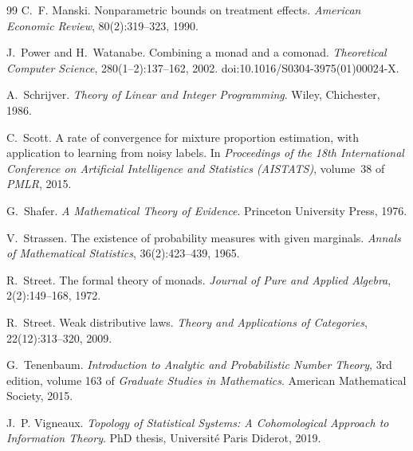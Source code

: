 \documentclass[11pt]{article}
\theoremstyle{definition}
\theoremstyle{remark}
\begin{document}
\begin{thebibliography}{99}
C.~F. Manski.
\newblock Nonparametric bounds on treatment effects.
\newblock \emph{American Economic Review}, 80(2):319--323, 1990.

J.~Power and H.~Watanabe.
\newblock Combining a monad and a comonad.
\newblock \emph{Theoretical Computer Science}, 280(1--2):137--162, 2002.
\newblock doi:10.1016/S0304-3975(01)00024-X.

A.~Schrijver.
\newblock \emph{Theory of Linear and Integer Programming}.
\newblock Wiley, Chichester, 1986.

C.~Scott.
\newblock A rate of convergence for mixture proportion estimation, with application to learning from
  noisy labels.
\newblock In \emph{Proceedings of the 18th International Conference on Artificial Intelligence and
  Statistics (AISTATS)}, volume~38 of \emph{PMLR}, 2015.

G.~Shafer.
\newblock \emph{A Mathematical Theory of Evidence}.
\newblock Princeton University Press, 1976.

V.~Strassen.
\newblock The existence of probability measures with given marginals.
\newblock \emph{Annals of Mathematical Statistics}, 36(2):423--439, 1965.

R.~Street.
\newblock The formal theory of monads.
\newblock \emph{Journal of Pure and Applied Algebra}, 2(2):149--168, 1972.

R.~Street.
\newblock Weak distributive laws.
\newblock \emph{Theory and Applications of Categories}, 22(12):313--320, 2009.

G.~Tenenbaum.
\newblock \emph{Introduction to Analytic and Probabilistic Number Theory}, 3rd edition, volume 163
  of \emph{Graduate Studies in Mathematics}.
\newblock American Mathematical Society, 2015.

J.~P. Vigneaux.
\newblock \emph{Topology of Statistical Systems: A Cohomological Approach to Information Theory}.
\newblock PhD thesis, Universit\'e Paris Diderot, 2019.

\end{thebibliography}
\end{document}
